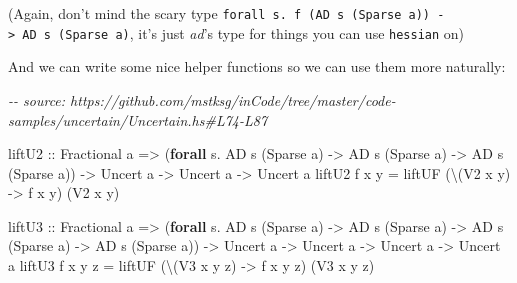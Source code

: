 \documentclass[]{article}
\newenvironment{Shaded}{}{}
\newcommand{\CommentTok}[1]{\textcolor[rgb]{0.38,0.63,0.69}{\textit{#1}}}
\newcommand{\DataTypeTok}[1]{\textcolor[rgb]{0.56,0.13,0.00}{#1}}
\newcommand{\KeywordTok}[1]{\textcolor[rgb]{0.00,0.44,0.13}{\textbf{#1}}}
\newcommand{\NormalTok}[1]{#1}
\newcommand{\OperatorTok}[1]{\textcolor[rgb]{0.40,0.40,0.40}{#1}}
\newcommand{\OtherTok}[1]{\textcolor[rgb]{0.00,0.44,0.13}{#1}}
\begin{document}
(Again, don't mind the scary type
\texttt{forall\ s.\ f\ (AD\ s\ (Sparse\ a))\ -\textgreater{}\ AD\ s\ (Sparse\ a)},
it's just \emph{ad}'s type for things you can use
\texttt{hessian\textquotesingle{}} on)

And we can write some nice helper functions so we can use them more naturally:

\begin{Shaded}
\begin{Highlighting}[]
\CommentTok{{-}{-} source: https://github.com/mstksg/inCode/tree/master/code{-}samples/uncertain/Uncertain.hs\#L74{-}L87}

\OtherTok{liftU2 ::} \DataTypeTok{Fractional}\NormalTok{ a}
       \OtherTok{=\textgreater{}}\NormalTok{ (}\KeywordTok{forall}\NormalTok{ s}\OperatorTok{.} \DataTypeTok{AD}\NormalTok{ s (}\DataTypeTok{Sparse}\NormalTok{ a) }\OtherTok{{-}\textgreater{}} \DataTypeTok{AD}\NormalTok{ s (}\DataTypeTok{Sparse}\NormalTok{ a) }\OtherTok{{-}\textgreater{}} \DataTypeTok{AD}\NormalTok{ s (}\DataTypeTok{Sparse}\NormalTok{ a))}
       \OtherTok{{-}\textgreater{}} \DataTypeTok{Uncert}\NormalTok{ a}
       \OtherTok{{-}\textgreater{}} \DataTypeTok{Uncert}\NormalTok{ a}
       \OtherTok{{-}\textgreater{}} \DataTypeTok{Uncert}\NormalTok{ a}
\NormalTok{liftU2 f x y }\OtherTok{=}\NormalTok{ liftUF (\textbackslash{}(}\DataTypeTok{V2}\NormalTok{ x\textquotesingle{} y\textquotesingle{}) }\OtherTok{{-}\textgreater{}}\NormalTok{ f x\textquotesingle{} y\textquotesingle{}) (}\DataTypeTok{V2}\NormalTok{ x y)}

\OtherTok{liftU3 ::} \DataTypeTok{Fractional}\NormalTok{ a}
       \OtherTok{=\textgreater{}}\NormalTok{ (}\KeywordTok{forall}\NormalTok{ s}\OperatorTok{.} \DataTypeTok{AD}\NormalTok{ s (}\DataTypeTok{Sparse}\NormalTok{ a) }\OtherTok{{-}\textgreater{}} \DataTypeTok{AD}\NormalTok{ s (}\DataTypeTok{Sparse}\NormalTok{ a) }\OtherTok{{-}\textgreater{}} \DataTypeTok{AD}\NormalTok{ s (}\DataTypeTok{Sparse}\NormalTok{ a) }\OtherTok{{-}\textgreater{}} \DataTypeTok{AD}\NormalTok{ s (}\DataTypeTok{Sparse}\NormalTok{ a))}
       \OtherTok{{-}\textgreater{}} \DataTypeTok{Uncert}\NormalTok{ a}
       \OtherTok{{-}\textgreater{}} \DataTypeTok{Uncert}\NormalTok{ a}
       \OtherTok{{-}\textgreater{}} \DataTypeTok{Uncert}\NormalTok{ a}
       \OtherTok{{-}\textgreater{}} \DataTypeTok{Uncert}\NormalTok{ a}
\NormalTok{liftU3 f x y z }\OtherTok{=}\NormalTok{ liftUF (\textbackslash{}(}\DataTypeTok{V3}\NormalTok{ x\textquotesingle{} y\textquotesingle{} z\textquotesingle{}) }\OtherTok{{-}\textgreater{}}\NormalTok{ f x\textquotesingle{} y\textquotesingle{} z\textquotesingle{}) (}\DataTypeTok{V3}\NormalTok{ x y z)}
\end{Highlighting}
\end{Shaded}
\end{document}
